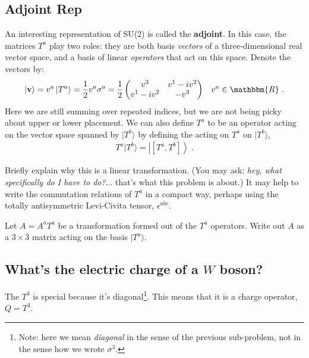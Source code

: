 \documentclass[12pt]{article}
\numberwithin{equation}{section}    %
\renewcommand{\vec}[1]{\mathbf{#1}} %
\begin{document}
\subsection{Adjoint Rep}

An interesting representation of SU(2) is called the \textbf{adjoint}. In this case, the matrices $T^a$ play two roles: they are both basis \emph{vectors} of a three-dimensional real vector space, and a basis of linear \emph{operators} that act on this space. Denote the vectors by:
\begin{align}
	\left|\vec{v}\right\rangle &= 
	v^a \left|T^a \right\rangle 
	= 
 	\frac{1}{2} v^a \sigma^a 
	= 
	\frac 12
	\begin{pmatrix}
		v^3 & v^1 - i v^2 \\
		v^1 - i v^2 & -v^3
	\end{pmatrix}
	&
	v^a \in \mathbbm{R} \ .
\end{align}
Here we are still summing over repeated indices, but we are not being picky about upper or lower placement.
We can also define $T^a$ to be an operator acting on the vector space spanned by $|T^b\rangle$ by defining the acting on $T^a$ on $|T^b\rangle$,
\begin{align}
	T^a | T^b \rangle 
	= \left| \left[ T^a, T^b \right] \right\rangle  
	\label{eq:action}
	\ .
\end{align}

Briefly explain why this is a linear transformation. (You may ask: \emph{hey, what specifically do I have to do?}... that's what this problem is about.) It may help to write the commutation relations of $T^a$ in a compact way, perhaps using the totally antisymmetric Levi-Civita tensor, $\epsilon^{abc}$.

Let $A = A^a T^a$ be a transformation formed out of the $T^a$ operators. Write out $A$ as a $3\times 3$ matrix acting on the basis $|T^a\rangle$. 

\subsection{What's the electric charge of a $W$ boson?}

The $T^3$ is special because it's diagonal\footnote{Note: here we mean \emph{diagonal} in the sense of the previous sub-problem, not in the sense how we wrote $\sigma^3$.}. This means that it is a charge operator, $Q = T^3$. 
\end{document}
